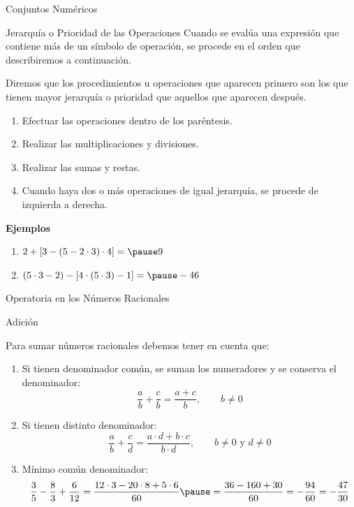 \documentclass[aspectratio=169,handout,11pt]{beamer}
\begin{document}
	\begin{frame}{Conjuntos Numéricos}
		\begin{block}{Jerarquía o Prioridad de las Operaciones}
			Cuando se evalúa una expresión que contiene más de un símbolo de operación, se procede en el orden que describiremos a continuación.
			\pause
			
			Diremos que los procedimientos u operaciones que aparecen primero son los que tienen mayor jerarquía o prioridad que aquellos que aparecen después.
			\pause
			
			\begin{enumerate}
				\item Efectuar las operaciones dentro de los paréntesis.
				\pause
				\item Realizar las multiplicaciones y divisiones.
				\pause
				\item Realizar las sumas y restas.
				\pause
				\item Cuando haya dos o más operaciones de igual jerarquía, se procede de izquierda a derecha.
				\pause
			\end{enumerate}
			
			\textbf{Ejemplos}
			\begin{enumerate}
				\item $2+[3-(5-2\cdot3)\cdot4]=\pause 9$
				\pause
				\item $(5\cdot3-2)-[4\cdot(5\cdot3)-1]=\pause -46$
				\pause
			\end{enumerate}
		\end{block}
	\end{frame}
	
	\begin{frame}{Operatoria en los Números Racionales}
		\begin{block}{Adición}
			\small{Para sumar números racionales debemos tener en cuenta que:
			\pause
			
			\begin{enumerate}
				\item Si tienen denominador común, se suman los numeradores y se conserva el denominador:
				\[
				\frac{a}{b}+\frac{c}{b}=\frac{a+c}{b},
				\qquad b\neq0
				\]
				\pause
				
				\item Si tienen distinto denominador:
				\[
				\frac{a}{b}+\frac{c}{d}=\frac{a\cdot d+b\cdot c}{b\cdot d},
				\qquad b\neq0 \text{ y } d\neq0
				\]
				\pause
				
				\item Mínimo común denominador:
				\[
				\frac{3}{5}-\frac{8}{3}+\frac{6}{12}
				=
				\frac{12\cdot3-20\cdot8+5\cdot6}{60}
				\pause
				=
				\frac{36-160+30}{60}
				=
				-\frac{94}{60}
				=
				-\frac{47}{30}
				\]
			\end{enumerate}
		}
		\end{block}
	\end{frame}
	
\end{document}

